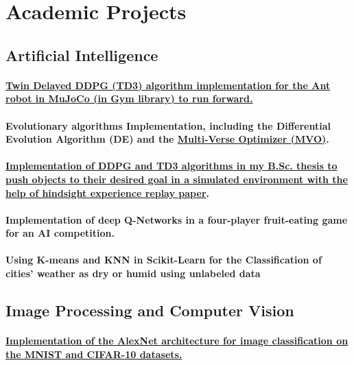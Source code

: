 \documentclass[a4paper]{article}
\begin{document}
\section{Academic Projects}

\subsection{Artificial Intelligence}

\paragraph{\href{https://github.com/ake1999/TD3_Ant_v4}{Twin Delayed DDPG (TD3) algorithm implementation for the Ant robot in MuJoCo (in Gym library) to run forward.}}
\paragraph{Evolutionary algorithms Implementation, including the Differential Evolution Algorithm (DE) and the \href{https://github.com/ake1999/MVO_MATLAB}{Multi-Verse Optimizer (MVO)}.}
\paragraph{\href{https://github.com/ake1999/aarm}{Implementation of DDPG and TD3 algorithms in my B.Sc. thesis to push objects to their desired goal in a simulated environment with the help of hindsight experience replay paper}.}
\paragraph{Implementation of deep Q-Networks in a four-player fruit-eating game for an AI competition.}
\paragraph{Using K-means and KNN in Scikit-Learn for the Classification of cities' weather as dry or humid using unlabeled data}
            
\subsection{Image Processing and Computer Vision}

\paragraph{\href{https://github.com/ake1999/CNN_AlexNet}{Implementation of the AlexNet architecture for image classification on the MNIST and CIFAR-10 datasets.}}
\end{document}
